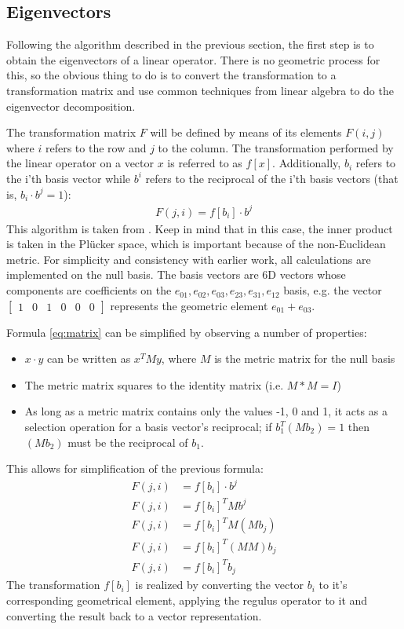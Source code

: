 \documentclass[a4paper, 10pt]{article}
\begin{document}
\subsection{Eigenvectors}
Following the algorithm described in the previous section, the first step is to
obtain the eigenvectors of a linear operator. There is no geometric process for
this, so the obvious thing to do is to convert the transformation to a
transformation matrix and use common techniques from linear algebra to do the
eigenvector decomposition. 

The transformation matrix $F$ will be defined by means of its elements $F(i, j)$
where $i$ refers to the row and $j$ to the column. The transformation performed
by the linear operator on a vector $x$ is referred to as $f[x]$. Additionally,
$b_i$ refers to the i'th basis vector while $b^i$ refers to the reciprocal of
the i'th basis vectors (that is, $b_i \cdot b^j = 1$):
\begin{align}
  F(j, i) = f[b_i] \cdot b^j \label{eq:matrix}
\end{align}
This algorithm is taken from \cite{dorst2009geometric}. Keep in mind that in
this case, the inner product is taken in the Pl\"{u}cker space, which is
important because of the non-Euclidean metric. For simplicity and consistency with earlier
work, all calculations are implemented on the null basis. The basis vectors are
6D vectors whose components are coefficients on the ${e_{01}, e_{02}, e_{03},
  e_{23}, e_{31}, e_{12}}$ basis, e.g. the vector $\begin{bmatrix} 1 & 0 & 1 & 0
  & 0 & 0 \end{bmatrix}$ represents the geometric element $e_{01} + e_{03}$.

Formula \ref{eq:matrix} can be simplified by observing a number of properties:
\begin{itemize}
  \item $x \cdot y$ can be written as $x^T M y$, where $M$ is the metric matrix
    for the null basis
  \item The metric matrix squares to the identity matrix (i.e. $M * M = I$)
  \item As long as a metric matrix contains only the values -1, 0 and 1, it acts
    as a selection operation for a basis vector's reciprocal; if $b_{1}^{T} (M b_{2}) = 1$
    then $(M b_{2})$ must be the reciprocal of $b_{1}$.
\end{itemize}
This allows for simplification of the previous formula:
\begin{align*}
  F(j, i) &= f[b_i] \cdot b^j \\
  F(j, i) &= f[b_i]^T M b^j \\
  F(j, i) &= f[b_i]^T M (M b_j) \\
  F(j, i) &= f[b_i]^T (M M) b_j \\
  F(j, i) &= f[b_i]^T b_j
\end{align*}
The transformation $f[b_i]$ is realized by converting the vector $b_i$ to it's
corresponding geometrical element, applying the regulus operator to it and
converting the result back to a vector representation.
\end{document}
